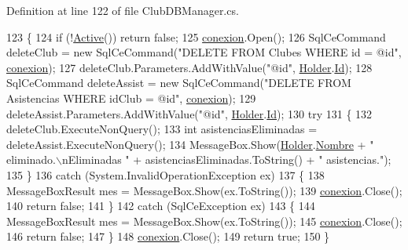 Definition at line 122 of file Club\-D\-B\-Manager.\-cs.


\begin{DoxyCode}
123         \{
124             \textcolor{keywordflow}{if} (!\hyperlink{class_asistencias__wpf_1_1_club_d_b_manager_a8d30f338a090ebf66923be98db072831}{Active}()) \textcolor{keywordflow}{return} \textcolor{keyword}{false};
125             \hyperlink{class_asistencias__wpf_1_1_club_d_b_manager_a61a2cc885a203121fabe30817fc97b76}{conexion}.Open();
126             SqlCeCommand deleteClub = \textcolor{keyword}{new} SqlCeCommand(\textcolor{stringliteral}{"DELETE FROM Clubes WHERE id = @id"}, 
      \hyperlink{class_asistencias__wpf_1_1_club_d_b_manager_a61a2cc885a203121fabe30817fc97b76}{conexion});
127             deleteClub.Parameters.AddWithValue(\textcolor{stringliteral}{"@id"}, \hyperlink{class_asistencias__wpf_1_1_club_d_b_manager_ab1863b4e35d108dd383a66ae76f8f0a8}{Holder}.\hyperlink{class_asistencias__wpf_1_1_club_a25ec9c585f6874004dc690ea2641ab0d}{Id});
128             SqlCeCommand deleteAssist = \textcolor{keyword}{new} SqlCeCommand(\textcolor{stringliteral}{"DELETE FROM Asistencias WHERE idClub = @id"}, 
      \hyperlink{class_asistencias__wpf_1_1_club_d_b_manager_a61a2cc885a203121fabe30817fc97b76}{conexion});
129             deleteAssist.Parameters.AddWithValue(\textcolor{stringliteral}{"@id"}, \hyperlink{class_asistencias__wpf_1_1_club_d_b_manager_ab1863b4e35d108dd383a66ae76f8f0a8}{Holder}.\hyperlink{class_asistencias__wpf_1_1_club_a25ec9c585f6874004dc690ea2641ab0d}{Id});
130             \textcolor{keywordflow}{try}
131             \{
132                 deleteClub.ExecuteNonQuery();
133                 \textcolor{keywordtype}{int} asistenciasEliminadas = deleteAssist.ExecuteNonQuery();
134                 MessageBox.Show(\hyperlink{class_asistencias__wpf_1_1_club_d_b_manager_ab1863b4e35d108dd383a66ae76f8f0a8}{Holder}.\hyperlink{class_asistencias__wpf_1_1_club_a0da21bbffe8ac3d877a51c03899bf8c2}{Nombre} + \textcolor{stringliteral}{" eliminado.\(\backslash\)nEliminadas "} + 
      asistenciasEliminadas.ToString() + \textcolor{stringliteral}{" asistencias."});
135             \}
136             \textcolor{keywordflow}{catch} (System.InvalidOperationException ex)
137             \{
138                 MessageBoxResult mes = MessageBox.Show(ex.ToString());
139                 \hyperlink{class_asistencias__wpf_1_1_club_d_b_manager_a61a2cc885a203121fabe30817fc97b76}{conexion}.Close();
140                 \textcolor{keywordflow}{return} \textcolor{keyword}{false};
141             \}
142             \textcolor{keywordflow}{catch} (SqlCeException ex)
143             \{
144                 MessageBoxResult mes = MessageBox.Show(ex.ToString());
145                 \hyperlink{class_asistencias__wpf_1_1_club_d_b_manager_a61a2cc885a203121fabe30817fc97b76}{conexion}.Close();
146                 \textcolor{keywordflow}{return} \textcolor{keyword}{false};
147             \}
148             \hyperlink{class_asistencias__wpf_1_1_club_d_b_manager_a61a2cc885a203121fabe30817fc97b76}{conexion}.Close();
149             \textcolor{keywordflow}{return} \textcolor{keyword}{true};
150         \}
\end{DoxyCode}
